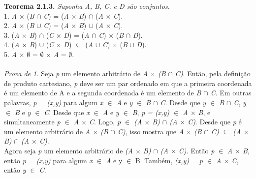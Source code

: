 \textbf{Teorema 2.1.3.} \textit{Suponha A, B, C, e D são conjuntos.}
\\
1. \textit{A} $\times$ (\textit{B} $\cap$ \textit{C}) = (\textit{A} $\times$ \textit{B}) $\cap$ (\textit{A} $\times$ \textit{C}).
\\
2. \textit{A} $\times$ (\textit{B} $\cup$ \textit{C}) = (\textit{A} $\times$ \textit{B}) $\cup$ (\textit{A} $\times$ \textit{C}).
\\
3. (\textit{A} $\times$ \textit{B}) $\cap$ (\textit{C} $\times$ \textit{D}) = (\textit{A} $\cap$ \textit{C}) $\times$ (\textit{B}
$\cap$ \textit{D}).
\\
4. (\textit{A} $\times$ \textit{B}) $\cup$ (\textit{C} $\times$ \textit{D}) $\subseteq$ (\textit{A} $\cup$ \textit{C}) $\times$ (\textit{B}
$\cup$ \textit{D}).
\\
5. \textit{A} $\times$ $\emptyset$ = $\emptyset$ $\times$ \textit{A} = $\emptyset$.  
\\
\\
\textit{Prova de 1. } Seja \textit{p} um elemento arbitrário de \textit{ A $\times$ (B $\cap$ C)}. Então, pela definição de produto
cartesiano, \textit{p} deve ser um par ordenado em que a primeira coordenada é um elemento de A e a segunda coordenada é um elemento
de \textit{B $\cap$ C}. Em outras palavras, \textit{p = (x,y)} para algum \textit{x $\in$ A} e \textit{y $\in$ B $\cap$ C}.
Desde que \textit{y $\in$ B $\cap$ C}, \textit{y $\in$ B} e \textit{y $\in$ C}. Desde que \textit{x $\in$ A} e \textit{y $\in$ B},
\textit{p = (x,y) $\in$ A $\times$ B}, e simultaneamente \textit{p $\in$ A $\times$ C}. Logo, \textit{p $\in$ (A $\times$ B) 
$\cap$ (A $\times$ C)}. Desde que \textit{p} é um elemento arbitrário de \textit{ A $\times$ (B $\cap$ C)}, isso mostra que 
\textit{ A $\times$ (B $\cap$ C) $\subseteq$ (A $\times$ B) $\cap$ (A $\times$ C)}.
\\
  Agora seja \textit{p} um elemento arbitrário de \textit{(A $\times$ B) $\cap$ (A $\times$ C)}. Então \textit{p} $\in$
  \textit{A $\times$ B}, então \textit{p = (x,y)} para algum \textit{x $\in$ A} e {y $\in$ B}. Também, \textit{(x,y) = p $\in$
  A $\times$ C}, então \textit{y $\in$ C}.
  